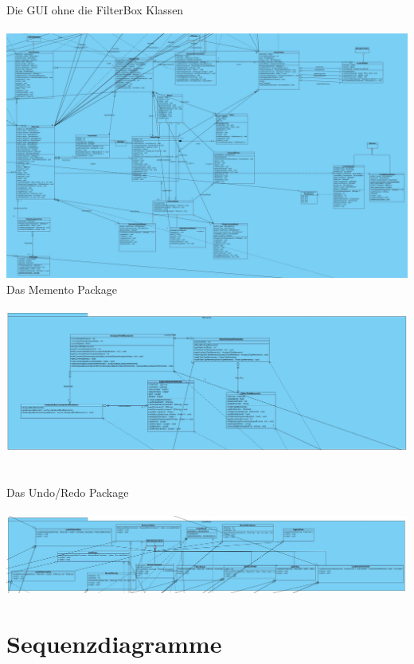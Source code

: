 \documentclass[twoside]{book}
\newcommand{\+}{\discretionary{\mbox{\scriptsize$\hookleftarrow$}}{}{}}
\begin{document}
\newpage
Die GUI ohne die FilterBox Klassen\\\\
{\centering\includegraphics[width=1\textwidth]{GUI_noFilter.jpg}}\\
\newpage
Das Memento Package\\\\
{\centering\includegraphics[width=1\textwidth]{Memento.jpg}}\\\\\\
Das Undo/Redo Package\\\\
{\centering\includegraphics[width=1\textwidth]{UndoRedo.jpg}}\\
\newpage
\section{Sequenzdiagramme}
\end{document}
